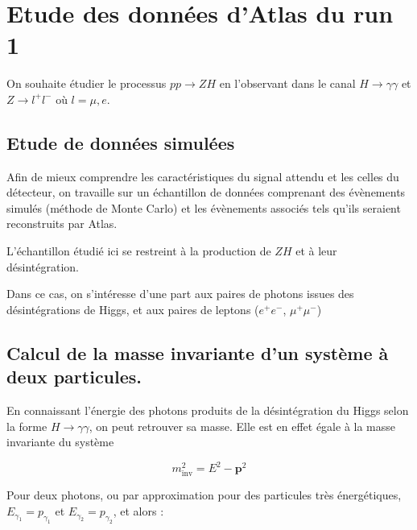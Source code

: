 \documentclass[11pt]{article} %
\begin{document}

\section{Etude des données d'Atlas du run 1}

On souhaite étudier le processus $pp\to ZH$ en l'observant dans le canal $H\to\gamma\gamma$ et $Z\to l^+l^-$ où $l=\mu,e$.

\subsection{Etude de données simulées}

Afin de mieux comprendre les caractéristiques du signal attendu et les celles du détecteur, on travaille sur un échantillon de données comprenant des évènements simulés (méthode de Monte Carlo) et les évènements associés tels qu'ils seraient reconstruits par Atlas.

L'échantillon étudié ici se restreint à la production de $ZH$ et à leur désintégration.

Dans ce cas, on s'intéresse d'une part aux paires de photons issues des désintégrations de Higgs, et aux paires de leptons ($e^+e^-$, $\mu^+\mu^-$)


\subsection{Calcul de la masse invariante d'un système à deux particules.}

En connaissant l'énergie des photons produits de la désintégration du Higgs selon la forme $H\to \gamma \gamma$, on peut retrouver sa masse. Elle est en effet égale à la masse invariante du système 

\begin{equation}
m_{\textrm{inv}}^2 = E^2 - \textbf{p}^2
\end{equation}

Pour deux photons,  ou par approximation pour des particules très énergétiques, $E_{\gamma_1} = p_{\gamma_1}$ et $E_{\gamma_2} = p_{\gamma_2}$, et alors :
\end{document}
